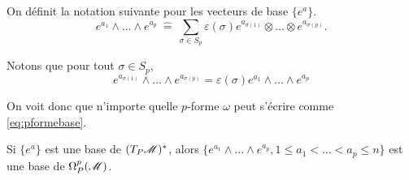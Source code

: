 \documentclass[a4paper,11pt]{report}
\begin{document}
            \begin{defn}
                On définit la notation suivante pour les vecteurs de base $\{e^a\}$.
                \begin{equation}
                    e^{a_1}\wedge \dots\wedge e^{a_{p}} ~\hat{=}~ \sum_{\sigma\in S_p}\varepsilon(\sigma)e^{a_{\sigma(1)}}\otimes\dots\otimes e^{a_{\sigma(p)}}.
                \end{equation}
            \end{defn}
            
            Notons que pour tout $\sigma\in S_p$,
            \begin{equation}
                e^{a_{\sigma(1)}}\wedge\dots\wedge e^{a_{\sigma(p)}} = \varepsilon(\sigma)e^{a_1}\wedge\dots \wedge e^{a_p}
            \end{equation}
            
            On voit donc que n'importe quelle $p$-forme $\omega$ peut s'écrire comme \ref{eq:pformebase}.
            \begin{prop}\begin{leftbar}
                Si $\{e^a\}$ est une base de $(T_P\mathscr{M})^*$, alors $\{e^{a_1}\wedge\dots \wedge e^{a_p},1\leq a_1<\dots<a_p\leq n\}$ est une base de $\Omega_P^p(\mathscr{M})$.
            \end{leftbar}\end{prop}
            
\end{document}
